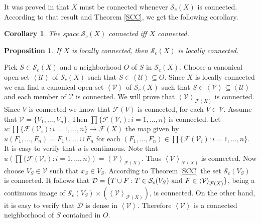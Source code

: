 \documentclass[11pt]{amsart}
\numberwithin{equation}{section}
\theoremstyle{plain}
\newtheorem{proposition}[equation]{Proposition}
\newtheorem{corollary}[equation]{Corollary}
\theoremstyle{definition}
\theoremstyle{definition}
\theoremstyle{definition}
\theoremstyle{definition}
\theoremstyle{definition}
\begin{document}
It was proved in \cite[Theorem 5.10]{may-pat-rob} that $X$ must be connected whenever $\mathcal{S}_c(X)$ is connected. According to that result and Theorem  \ref{SCC}, we get the following corollary.

\begin{corollary}\label{SCCc}
The space $\mathcal{S}_c(X)$ connected iff $X$ connected.
\end{corollary}

\begin{proposition}
If $X$ is locally connected, then $\mathcal{S}_c(X)$ is locally connected.
\end{proposition}

\proof
Pick $S \in \mathcal{S}_c(X)$ and a neighborhood $O$ of $S$ in $\mathcal{S}_c(X)$. Choose a canonical open set $\left\langle \mathcal{U}\right\rangle$ of $\mathcal{S}_c(X)$ such that $S \in  \left\langle \mathcal{U}\right\rangle \subseteq O$. Since $X$ is locally connected we can find a canonical open set $\left\langle \mathcal{V}\right\rangle$ of $\mathcal{S}_c(X)$ such that $S \in  \left\langle \mathcal{V}\right\rangle \subseteq \left\langle \mathcal{U}\right\rangle$ and each member of $\mathcal{V}$ is connected. We will prove that $\left\langle \mathcal{V}\right\rangle_{\mathcal{F}(X)}$ is connected. Since $V$ is connected we know that $\mathcal{F}(V)$ is connected, for each $V \in \mathcal{V}$. Assume that $\mathcal{V} = \{V_1,\ldots,V_n\}$. Then $\prod\{\mathcal{F}(\mathcal{V}_i) : i = 1,\ldots,n\}$ is connected. Let $u : \prod\{\mathcal{F}(\mathcal{V}_i) : i = 1,\ldots,n\} \to \mathcal{F}(X)$ the map given by $u(F_1,\ldots,F_n) = F_1 \cup \ldots \cup F_n$ for each $(F_1,\ldots,F_n) \in \prod\{\mathcal{F}(\mathcal{V}_i) : i = 1,\ldots,n\}$. It is easy to verify that $u$ is continuous. Note that $u(\prod\{\mathcal{F}(\mathcal{V}_i) : i = 1,\ldots,n\}) = \left\langle \mathcal{V}\right\rangle_{\mathcal{F}(X)}$. Thus $\left\langle \mathcal{V}\right\rangle_{\mathcal{F}(X)}$ is connected. Now choose $V_S \in \mathcal{V}$ such that $x_S \in V_S$. According to Theorem \ref{SCC} the set $\mathcal{S}_c(V_S)$ is connected. It follows that $\mathcal{D} = \{T \cup F : T \in \mathcal{S}_c(V_S) \textnormal{ and } F \in \left\langle \mathcal{V}\right\rangle_{\mathcal{F}(X)}\}$, being a continuous image of $\mathcal{S}_c(V_S) \times (\left\langle \mathcal{V}\right\rangle_{\mathcal{F}(X)})$, is connected. On the other hand, it is easy to verify that $\mathcal{D}$ is dense in $\left\langle \mathcal{V}\right\rangle$. Therefore $\left\langle \mathcal{V}\right\rangle$ is a connected neighborhood of $S$ contained in $O$.
\endproof
\end{document}

